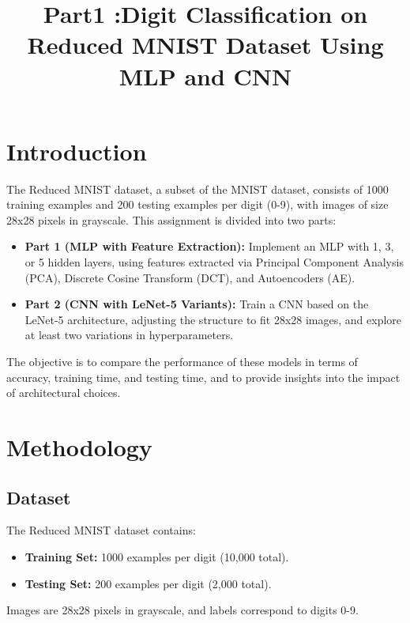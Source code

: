 \documentclass[a4paper,12pt]{article}
\title{Part1 :Digit Classification on Reduced MNIST Dataset Using MLP and CNN}
\begin{document}
\maketitle

\section{Introduction}
The Reduced MNIST dataset, a subset of the MNIST dataset, consists of 1000 training examples and 200 testing examples per digit (0-9), with images of size 28x28 pixels in grayscale. This assignment is divided into two parts:

\begin{itemize}
    \item \textbf{Part 1 (MLP with Feature Extraction):} Implement an MLP with 1, 3, or 5 hidden layers, using features extracted via Principal Component Analysis (PCA), Discrete Cosine Transform (DCT), and Autoencoders (AE).
    \item \textbf{Part 2 (CNN with LeNet-5 Variants):} Train a CNN based on the LeNet-5 architecture, adjusting the structure to fit 28x28 images, and explore at least two variations in hyperparameters.
\end{itemize}

The objective is to compare the performance of these models in terms of accuracy, training time, and testing time, and to provide insights into the impact of architectural choices.

\section{Methodology}

\subsection{Dataset}
The Reduced MNIST dataset contains:
\begin{itemize}
    \item \textbf{Training Set:} 1000 examples per digit (10,000 total).
    \item \textbf{Testing Set:} 200 examples per digit (2,000 total).
\end{itemize}
Images are 28x28 pixels in grayscale, and labels correspond to digits 0-9.
\end{document}
